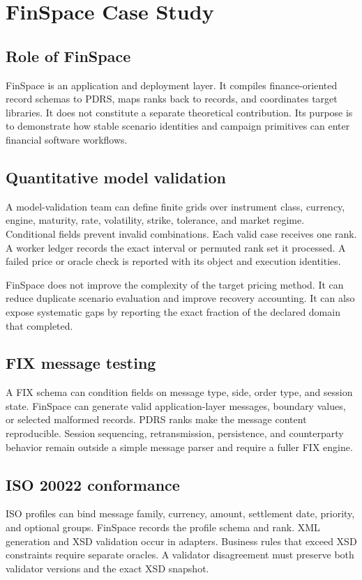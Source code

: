 \section{FinSpace Case Study}\label{sec:finspace}
\subsection{Role of FinSpace}
FinSpace is an application and deployment layer. It compiles finance-oriented record schemas to PDRS, maps ranks back to records, and coordinates target libraries. It does not constitute a separate theoretical contribution. Its purpose is to demonstrate how stable scenario identities and campaign primitives can enter financial software workflows.

\subsection{Quantitative model validation}
A model-validation team can define finite grids over instrument class, currency, engine, maturity, rate, volatility, strike, tolerance, and market regime. Conditional fields prevent invalid combinations. Each valid case receives one rank. A worker ledger records the exact interval or permuted rank set it processed. A failed price or oracle check is reported with its object and execution identities.

FinSpace does not improve the complexity of the target pricing method. It can reduce duplicate scenario evaluation and improve recovery accounting. It can also expose systematic gaps by reporting the exact fraction of the declared domain that completed.

\subsection{FIX message testing}
A FIX schema can condition fields on message type, side, order type, and session state. FinSpace can generate valid application-layer messages, boundary values, or selected malformed records. PDRS ranks make the message content reproducible. Session sequencing, retransmission, persistence, and counterparty behavior remain outside a simple message parser and require a fuller FIX engine.

\subsection{ISO 20022 conformance}
ISO profiles can bind message family, currency, amount, settlement date, priority, and optional groups. FinSpace records the profile schema and rank. XML generation and XSD validation occur in adapters. Business rules that exceed XSD constraints require separate oracles. A validator disagreement must preserve both validator versions and the exact XSD snapshot.

